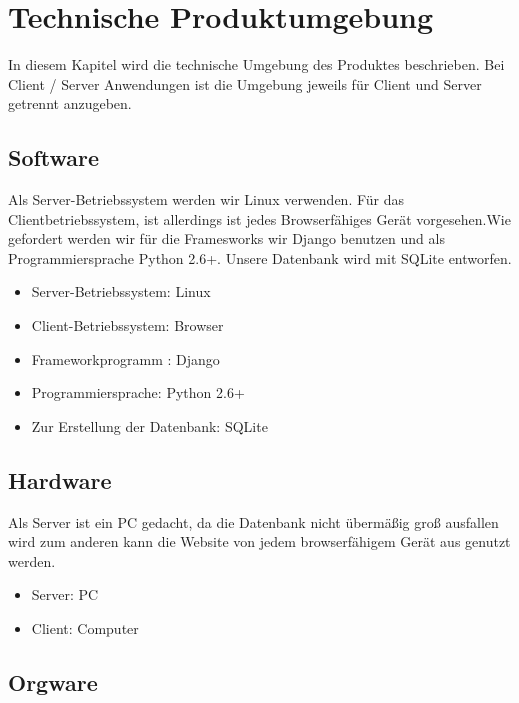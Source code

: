 
\chapter{Technische Produktumgebung}

In diesem Kapitel wird die technische Umgebung des Produktes beschrieben. Bei
Client / Server  Anwendungen ist die Umgebung jeweils für Client und Server
getrennt anzugeben.

\section{Software}
Als Server-Betriebssystem werden wir Linux verwenden. Für das Clientbetriebssystem, ist allerdings ist jedes Browserfähiges Gerät vorgesehen.Wie gefordert  werden wir für die Framesworks wir Django benutzen und als Programmiersprache Python 2.6+. Unsere Datenbank wird mit SQLite entworfen.

\begin{itemize}
\item Server-Betriebssystem:              Linux
\item Client-Betriebssystem:                Browser
\item Frameworkprogramm :                Django
\item Programmiersprache:                  Python 2.6+
\item Zur Erstellung der Datenbank:   SQLite
\end{itemize}



\section{Hardware}
Als Server ist ein PC gedacht, da die Datenbank nicht übermäßig groß ausfallen wird zum anderen kann die Website von jedem browserfähigem Gerät aus genutzt werden.


\begin{itemize}
\item Server: PC
\item Client: Computer
\end{itemize}

\section{Orgware}

